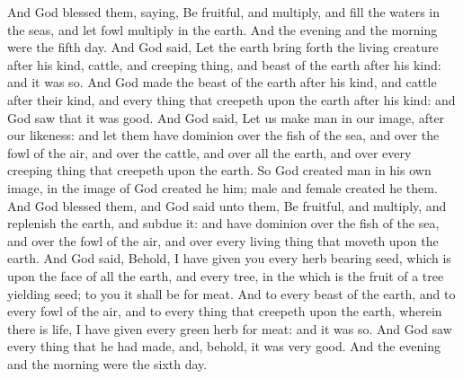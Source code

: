 \begin{biblechapter}
\verse And God blessed them, saying, Be fruitful, and multiply, and fill the waters in the seas, and let fowl multiply in the earth.
\verse And the evening and the morning were the fifth day.
\verse And God said, Let the earth bring forth the living creature after his kind, cattle, and creeping thing, and beast of the earth after his kind: and it was so.
\verse And God made the beast of the earth after his kind, and cattle after their kind, and every thing that creepeth upon the earth after his kind: and God saw that it was good.
\verse And God said, Let us make man in our image, after our likeness: and let them have dominion over the fish of the sea, and over the fowl of the air, and over the cattle, and over all the earth, and over every creeping thing that creepeth upon the earth.
\verse So God created man in his own image, in the image of God created he him; male and female created he them.
\verse And God blessed them, and God said unto them, Be fruitful, and multiply, and replenish the earth, and subdue it: and have dominion over the fish of the sea, and over the fowl of the air, and over every living thing that moveth upon the earth.
\verse And God said, Behold, I have given you every herb bearing seed, which is upon the face of all the earth, and every tree, in the which is the fruit of a tree yielding seed; to you it shall be for meat.
\verse And to every beast of the earth, and to every fowl of the air, and to every thing that creepeth upon the earth, wherein there is life, I have given every green herb for meat: and it was so.
\verse And God saw every thing that he had made, and, behold, it was very good. And the evening and the morning were the sixth day.
\end{biblechapter}

